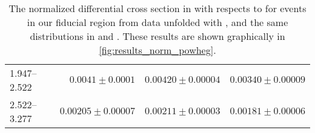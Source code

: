 \begin{table}
\begin{center}
\begin{tabular}{@{}l r r r@{}}
            1.947--2.522  &  $0.0041   \pm  0.0001$   &  $0.00420  \pm  0.00004$  &  $0.00340  \pm  0.00009$  \\
            2.522--3.277  &  $0.00205  \pm  0.00007$  &  $0.00211  \pm  0.00003$  &  $0.00181  \pm  0.00006$  \\
            \bottomrule
        \end{tabular}
    \end{center}
    \caption[
        The normalized differential cross section in \pb with respects to
        \phistar for \Ztoee events in our fiducial region from data unfolded
        with \POWHEG.
    ]{
        The normalized differential cross section in \pb with respects to
        \phistar for \Ztoee events in our fiducial region from data unfolded
        with \POWHEG, and the same distributions in \MADGRAPH and \POWHEG.
        These results are shown graphically in \cref{fig:results_norm_powheg}.
    }
    \label{tab:results_norm_powheg}
\end{table}
